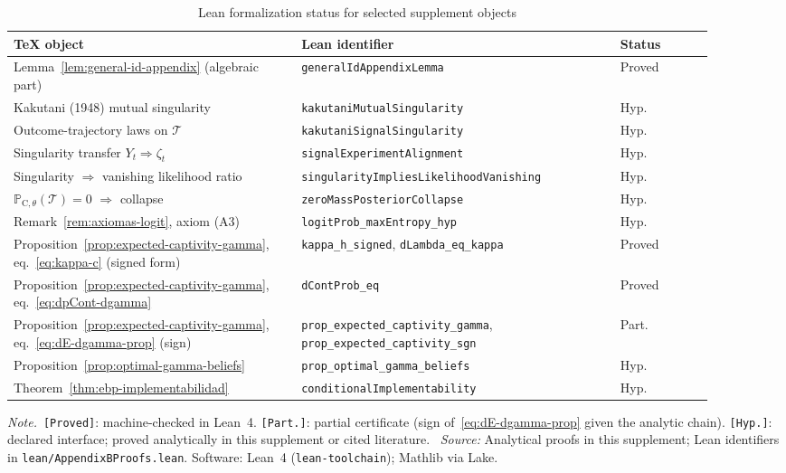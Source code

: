 \documentclass[12pt]{article}
\numberwithin{equation}{section}
\numberwithin{table}{section}
\theoremstyle{definition}
\newcommand{\ProbC}[1]{\mathbb{P}_{\mathrm{C},#1}}
\newcommand{\tabnote}{\par\addvspace{0.4em}\noindent\emph{Note.}}
\newcommand{\tabsource}{\ \textit{Source:} Analytical proofs in this supplement;
  Lean identifiers in \texttt{lean/AppendixBProofs.lean}. Software: Lean~4
  (\texttt{lean-toolchain}); Mathlib via Lake.}
\begin{document}
\begin{table}[htbp]
\centering
\scriptsize
\caption{Lean formalization status for selected supplement objects}
\label{tab:lean-status}
\setlength{\tabcolsep}{3pt}
\renewcommand{\arraystretch}{1.15}
\begin{tabular}{@{}%
  >{\raggedright\arraybackslash}p{0.37\linewidth}%
  >{\raggedright\arraybackslash}p{0.41\linewidth}%
  >{\raggedright\arraybackslash}p{0.12\linewidth}@{}}
\toprule
TeX object & Lean identifier & Status \\
\midrule
Lemma~\ref{lem:general-id-appendix} (algebraic part)
  & \texttt{generalIdAppendix\-Lemma} & Proved \\
Kakutani (1948) mutual singularity
  & \texttt{kakutani\-Mutual\-Singularity} & Hyp. \\
Outcome-trajectory laws on $\mathcal{T}$
  & \texttt{kakutani\-Signal\-Singularity} & Hyp. \\
Singularity transfer $Y_t\Rightarrow\zeta_t$
  & \texttt{signal\-Experiment\-Alignment} & Hyp. \\
Singularity $\Rightarrow$ vanishing likelihood ratio
  & \texttt{singularity\-Implies\-Likelihood\-Vanishing} & Hyp. \\
$\ProbC{\theta}(\mathcal{T})=0$ $\Rightarrow$ collapse
  & \texttt{zeroMass\-Posterior\-Collapse} & Hyp. \\
Remark~\ref{rem:axiomas-logit}, axiom (A3)
  & \texttt{logitProb\-\_max\-Entropy\-\_hyp} & Hyp. \\
Proposition~\ref{prop:expected-captivity-gamma}, eq.~\eqref{eq:kappa-c}
  (signed form)
  & \texttt{kappa\_h\_signed}, \texttt{dLambda\_eq\_kappa} & Proved \\
Proposition~\ref{prop:expected-captivity-gamma}, eq.~\eqref{eq:dpCont-dgamma}
  & \texttt{dContProb\_eq} & Proved \\
Proposition~\ref{prop:expected-captivity-gamma}, eq.~\eqref{eq:dE-dgamma-prop}
  (sign)
  & \texttt{prop\-\_expected\-\_captivity\-\_gamma},
    \texttt{prop\-\_expected\-\_captivity\-\_sgn} & Part. \\
Proposition~\ref{prop:optimal-gamma-beliefs}
  & \texttt{prop\-\_optimal\-\_gamma\-\_beliefs} & Hyp. \\
Theorem~\ref{thm:ebp-implementabilidad}
  & \texttt{conditional\-Implementability} & Hyp. \\
\bottomrule
\end{tabular}
\tabnote\ \texttt{[Proved]}: machine-checked in Lean~4. \texttt{[Part.]}:
partial certificate (sign of~\eqref{eq:dE-dgamma-prop} given the analytic
chain). \texttt{[Hyp.]}: declared interface; proved analytically in this
supplement or cited literature.
\tabsource
\end{table}
\end{document}
